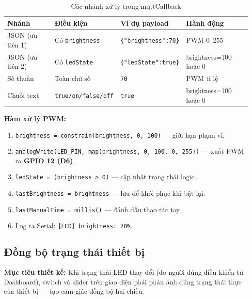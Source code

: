 \documentclass[13pt,a4paper]{article}
\newcommand{\code}[1]{\texttt{#1}}
\begin{document}
\begin{table}[htbp]
    \centering
    \caption{Các nhánh xử lý trong mqttCallback}
    \label{tbl:callback}
    \begin{tabular}{|L{2.5cm}|C{4cm}|C{3.5cm}|C{3cm}|}
        \hline
        \textbf{Nhánh} & \textbf{Điều kiện} & \textbf{Ví dụ payload} & \textbf{Hành động} \\
        \hline
        JSON (ưu tiên 1) & Có \code{brightness} & \code{\{"brightness":70\}} & PWM 0--255 \\
        \hline
        JSON (ưu tiên 2) & Có \code{ledState} & \code{\{"ledState":true\}} & brightness=100 hoặc 0 \\
        \hline
        Số thuần & Toàn chữ số & \code{70} & PWM tỉ lệ \\
        \hline
        Chuỗi text & \code{true/on/false/off} & \code{true} & brightness=100 hoặc 0 \\
        \hline
    \end{tabular}
\end{table}

\textbf{Hàm xử lý PWM:}

\begin{enumerate}[label=\arabic*., leftmargin=1.5cm]
    \item \code{brightness = constrain(brightness, 0, 100)} --- giới hạn phạm vi.
    \item \code{analogWrite(LED\_PIN, map(brightness, 0, 100, 0, 255))} --- xuất PWM ra \textbf{GPIO 12 (D6)}.
    \item \code{ledState = (brightness > 0)} --- cập nhật trạng thái logic.
    \item \code{lastBrightness = brightness} --- lưu để khôi phục khi bật lại.
    \item \code{lastManualTime = millis()} --- đánh dấu thao tác tay.
    \item Log ra Serial: \code{[LED] brightness: 70\%}.
\end{enumerate}

\subsection{Đồng bộ trạng thái thiết bị}
\label{sec:dongbo}

\textbf{Mục tiêu thiết kế:} Khi trạng thái LED thay đổi (do người dùng điều khiển từ Dashboard), switch và slider trên giao diện phải phản ánh đúng trạng thái thực của thiết bị --- tạo cảm giác đồng bộ hai chiều.
\end{document}
